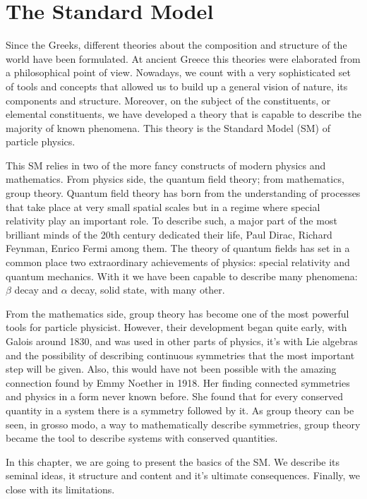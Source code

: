\chapter[The Standard Model]{The Standard Model}
\label{chap:SM}
Since the Greeks, different theories about the composition and structure of the world have been formulated. At ancient Greece this theories were elaborated from a philosophical point of view. Nowadays, we count with a very sophisticated  set of tools and concepts that allowed us to build up a general vision of nature, its components and structure. Moreover, on the subject of the constituents, or elemental constituents, we have developed a theory that is capable to describe the majority of known phenomena. This theory is the Standard Model (SM) of particle physics. 

This SM relies in two of the more fancy constructs of modern physics and mathematics. From physics side, the quantum field theory; from mathematics, group theory. Quantum field theory has born from the understanding of processes that take place at very small spatial scales but in a regime where special relativity play an important role. To describe such, a major part of the most brilliant minds of the 20th century dedicated their life, Paul Dirac, Richard Feynman, Enrico Fermi among them. The theory of quantum fields has set in a common place two extraordinary achievements of physics: special relativity and quantum mechanics. With it we have been capable to describe many phenomena: $\beta$ decay and $\alpha$ decay, solid state, with many other.

From the mathematics side, group theory has become one of the most powerful tools for particle physicist. However, their development began quite early, with Galois around 1830, and was used in other parts of physics, it's with Lie algebras and the possibility of describing continuous symmetries that the most important step will be given. Also, this would have not been possible with the amazing connection found by Emmy Noether in 1918. Her finding connected symmetries and physics in a form never known before. She found that for every conserved quantity in a system there is a symmetry followed by it. As group theory can be seen, in grosso modo, a way to mathematically describe symmetries, group theory became the tool to describe systems with conserved quantities. 

In this chapter, we are going to present the basics of the SM. We describe its seminal ideas, it structure and content and it's ultimate consequences. Finally, we close with its limitations.

